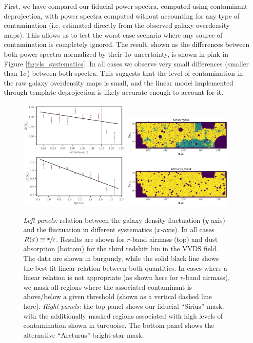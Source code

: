 \documentclass[a4paper,11pt]{article}
\begin{document}
      First, we have compared our fiducial power spectra, computed using contaminant deprojection, with power spectra computed without accounting for any type of contamination (i.e. estimated directly from the observed galaxy overdensity maps). This allows us to test the worst-case scenario where any source of contamination is completely ignored. The result, shown as the differences between both power spectra normalized by their 1$\sigma$ uncertainty, is shown in pink in Figure \ref{fig:cls_systematics}. In all cases we observe very small differences (smaller than $1\sigma$) between both spectra. This suggests that the level of contamination in the raw galaxy overdensity maps is small, and the linear model implemented through template deprojection is likely accurate enough to account for it.
      \begin{figure}
        \centering
        \includegraphics[width=0.49\textwidth]{figures/ndens_syst.pdf}
        \includegraphics[width=0.49\textwidth]{figures/systmask.pdf}
        \caption{{\sl Left panels:} relation between the galaxy density fluctuation ($y$ axis) and the fluctuation in different systematics ($x$-axis). In all cases $R(x)\equiv \sfrac{x}{\bar{x}}$. Results are shown for $r$-band airmass (top) and dust absorption (bottom) for the third redshift bin in the VVDS field. The data are shown in burgundy, while the solid black line shows the best-fit linear relation between both quantities. In cases where a linear relation is not appropriate (as shown here for $r$-band airmass), we mask all regions where the associated contaminant is above/below a given threshold (shown as a vertical dashed line here). {\sl Right panels:} the top panel shows our fiducial ``Sirius'' mask, with the additionally masked regions associated with high levels of contamination shown in turquoise. The bottom panel shows the alternative ``Arcturus'' bright-star mask.}
        \label{fig:ndens_syst}
      \end{figure}
      
\end{document}
